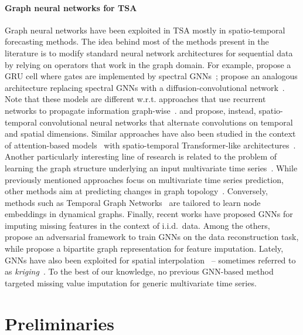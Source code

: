 \documentclass{article} \usepackage{iclr2022_conference,times}
\begin{document}
\paragraph{Graph neural networks for TSA} Graph neural networks have been exploited in TSA mostly in spatio-temporal forecasting methods. The idea behind most of the methods present in the literature is to modify standard neural network architectures for sequential data by relying on operators that work in the graph domain. For example, \citet{seo2018structured} propose a GRU cell where gates are implemented by spectral GNNs~\citep{defferrard2016convolutional}; \citet{li2018diffusion} propose an analogous architecture replacing spectral GNNs with a diffusion-convolutional network~\citep{atwood2016diffusion}. Note that these models are different w.r.t. approaches that use recurrent networks to propagate information graph-wise~\citep{scarselli2008graph, li2016gated}. \citet{yu2017spatio} and \citet{wu2019graph, wu2020connecting} propose, instead, spatio-temporal convolutional neural networks that alternate convolutions on temporal and spatial dimensions. Similar approaches have also been studied in the context of attention-based models~\citep{vaswani2017attention} with spatio-temporal Transformer-like architectures~\citep{zhang2018gaan, cai2020traffic}. Another particularly interesting line of research is related to the problem of learning the graph structure underlying an input multivariate time series~\citep{kipf2018neural, wu2020connecting, shang2020discrete}. While previously mentioned approaches focus on multivariate time series prediction, other methods aim at predicting changes in graph topology~\citep{zambon2019autoregressive, paassen2020graph}. Conversely, methods such as Temporal Graph Networks~\citep{rossi2020temporal} are tailored to learn node embeddings in dynamical graphs. Finally, recent works have proposed GNNs for imputing missing features in the context of i.i.d.\ data. Among the others, \citet{spinelli2020missing} propose an adversarial framework to train GNNs on the data reconstruction task, while \citet{you2020handling} propose a bipartite graph representation for feature imputation. Lately, GNNs have also been exploited for spatial interpolation~\citep{appleby2020kriging, wu2020inductive} -- sometimes referred to as \textit{kriging}~\citep{stein1999interpolation}. To the best of our knowledge, no previous GNN-based method targeted missing value imputation for generic multivariate time series.

\section{Preliminaries}\label{s:problem}
\end{document}
